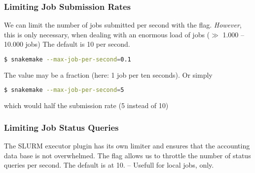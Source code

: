 \begin{frame}[fragile]
	\frametitle{Limiting Job Submission Rates}
	\begin{docs}
		We can limit the number of jobs submitted per second with the  flag.\newline
		\emph{However}, this is only necessary, when dealing with an enormous load of jobs ($\gg$ 1.000 -- 10.000 jobs)\newline\pause
		The default is 10 per second.
	\end{docs}
    \begin{lstlisting}[language=Bash, style=Shell]
$ snakemake --max-job-per-second=0.1
   \end{lstlisting}	
   The value may be a fraction (here: 1 job per ten seconds). Or simply
   \begin{lstlisting}[language=Bash, style=Shell]
   	$ snakemake --max-job-per-second=5
   \end{lstlisting}
   which would half the submission rate (5 instead of 10)
\end{frame}

\begin{frame}[fragile]
	\frametitle{Limiting Job Status Queries}
	\begin{docs}
		The SLURM executor plugin has its own limiter and ensures that the accounting data base is not overwhelmed.\newline
		The  flag allows us to throttle the number of status queries per second.\newline
		The default is at 10. -- Usefull for local jobs, only.
    \end{docs}
\end{frame}